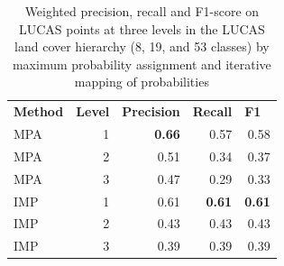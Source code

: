     \begin{table}[]
    \begin{tabular}{lrrrr}
    \textbf{Method} & \multicolumn{1}{l}{\textbf{Level}} & \multicolumn{1}{l}{\textbf{Precision}} & \multicolumn{1}{l}{\textbf{Recall}} & \multicolumn{1}{l}{\textbf{F1}} \\
    MPA & 1 & \textbf{0.66} & 0.57 & 0.58 \\
    MPA & 2 & 0.51 & 0.34 & 0.37 \\
    MPA & 3 & 0.47 & 0.29 & 0.33 \\
    IMP & 1 & 0.61 & \textbf{0.61} & \textbf{0.61} \\
    IMP & 2 & 0.43 & 0.43 & 0.43 \\
    IMP & 3 & 0.39 & 0.39 & 0.39
    \end{tabular}
    \caption{Weighted precision, recall and F1-score on LUCAS points at three levels in the LUCAS land cover hierarchy (8, 19, and 53 classes) by maximum probability assignment and iterative mapping of probabilities}
    \label{tab:05_calibration_accuracy}
    \end{table}


